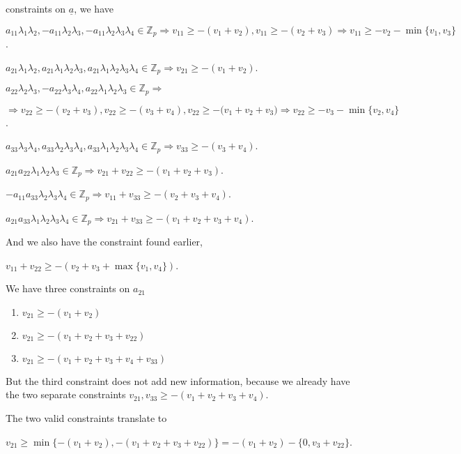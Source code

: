\documentclass{article}
\begin{document}
constraints on $\underline{a}$, we have

$a_{11}\lambda_{1}\lambda_{2},-a_{11}\lambda_{2}\lambda_{3},-a_{11}\lambda_{2}\lambda_{3}\lambda_{4}\in\mathbb{Z}_{p}\Rightarrow{v_{11}\geq{-(v_{1}+v_{2})},v_{11}\geq{-(v_{2}+v_{3})}}\Rightarrow{v_{11}\geq{-v_{2}-\min\{v_{1},v_{3}\}}}$. 

$a_{21}\lambda_{1}\lambda_{2},a_{21}\lambda_{1}\lambda_{2}\lambda_{3},a_{21}\lambda_{1}\lambda_{2}\lambda_{3}\lambda_{4}\in\mathbb{Z}_{p}\Rightarrow{v_{21}\geq{-(v_{1}+v_{2})}}$.

$a_{22}\lambda_{2}\lambda_{3},-a_{22}\lambda_{3}\lambda_{4},a_{22}\lambda_{1}\lambda_{2}\lambda_{3}\in\mathbb{Z}_{p}\Rightarrow$

$\Rightarrow{v_{22}\geq{-(v_{2}+v_{3})},v_{22}\geq{-(v_{3}+v_{4})},v_{22}\geq{-(v_{1}+v_{2}+v_{3}}})\Rightarrow{v_{22}\geq{-v_{3}-\min\{v_{2},v_{4}\}}}$.

$a_{33}\lambda_{3}\lambda_{4},a_{33}\lambda_{2}\lambda_{3}\lambda_{4},a_{33}\lambda_{1}\lambda_{2}\lambda_{3}\lambda_{4}\in\mathbb{Z}_{p}\Rightarrow{v_{33}\geq{-(v_{3}+v_{4})}}$.

$a_{21}a_{22}\lambda_{1}\lambda_{2}\lambda_{3}\in\mathbb{Z}_{p}\Rightarrow{v_{21}+v_{22}\geq{-(v_{1}+v_{2}+v_{3})}}$.

$-a_{11}a_{33}\lambda_{2}\lambda_{3}\lambda_{4}\in\mathbb{Z}_{p}\Rightarrow{v_{11}+v_{33}\geq{-(v_{2}+v_{3}+v_{4})}}$.

$a_{21}a_{33}\lambda_{1}\lambda_{2}\lambda_{3}\lambda_{4}\in\mathbb{Z}_{p}\Rightarrow{v_{21}+v_{33}\geq{-(v_{1}+v_{2}+v_{3}+v_{4})}}$.

And we also have the constraint found earlier, 

$v_{11}+v_{22}\geq{-(v_{2}+v_{3}+\max\{v_{1},v_{4}\})}$.

We have three constraints on $a_{21}$
\begin{enumerate}
    \item $v_{21}\geq{-(v_{1}+v_{2})}$
    \item $v_{21}\geq{-(v_{1}+v_{2}+v_{3}+v_{22})}$
    \item $v_{21}\geq{-(v_{1}+v_{2}+v_{3}+v_{4}+v_{33})}$
\end{enumerate}
But the third constraint does not add new information, because we already have the two separate constraints $v_{21},v_{33}\geq{-(v_{1}+v_{2}+v_{3}+v_{4})}$.

The two valid constraints translate to 

$v_{21}\geq{\min\{-(v_{1}+v_{2}),-(v_{1}+v_{2}+v_{3}+v_{22})\}=-(v_{1}+v_{2})-\{0,v_{3}+v_{22}\}}$.
\end{document}
